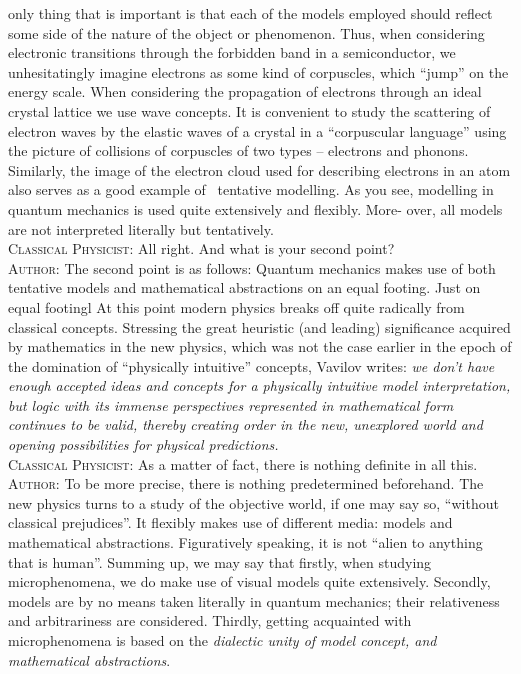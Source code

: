 \documentclass[a4paper,sfsidenotes,colorlinks=true]{tufte-book}
\numberwithin{equation}{section}
\numberwithin{figure}{section}
\begin{document}
only thing that is important is that each of the models employed
should reflect some side of the nature of the object or
phenomenon. Thus, when considering electronic transitions through the
forbidden band in a semiconductor, we unhesitatingly imagine electrons
as some kind of corpuscles, which ``jump'' on the energy scale. When
considering the propagation of electrons through an ideal crystal
lattice we use wave concepts. It is convenient to study the scattering
of electron waves by the elastic waves of a crystal in a ``corpuscular
language'' using the picture of collisions of corpuscles of two types
-- electrons and phonons.  Similarly, the image of the electron cloud
used for describing electrons in an atom also serves as a good example
of ~tentative modelling. As you see, modelling in quantum mechanics is
used quite extensively and flexibly. More- over, all models are not
interpreted literally but tentatively.
\\
\textsc{Classical Physicist:} All right. And what is your second
point?
\\
\textsc{Author:} The second point is as follows: Quantum mechanics
makes use of both tentative models and mathematical abstractions on an
equal footing. Just on equal footingl At this point modern physics
breaks off quite radically from classical concepts. Stressing the
great heuristic (and leading) significance acquired by mathematics in
the new physics, which was not the case earlier in the epoch of the
domination of ``physically intuitive'' concepts, Vavilov writes:
\emph{we don't have enough accepted ideas and concepts for a
  physically intuitive model interpretation, but logic with its
  immense perspectives represented in mathematical form continues to
  be valid, thereby creating order in the new, unexplored world and
  opening possibilities for physical predictions.}\cite{vavilov-1970}
\\
\textsc{Classical Physicist:} As a matter of fact, there is nothing
definite in all this.
\\
\textsc{Author:} To be more precise, there is nothing predetermined
beforehand. The new physics turns to a study of the objective world,
if one may say so, ``without classical prejudices''. It flexibly makes
use of different media: models and mathematical
abstractions. Figuratively speaking, it is not ``alien to anything
that is human''. Summing up, we may say that firstly, when studying
microphenomena, we do make use of visual models quite
extensively. Secondly, models are by no means taken literally in
quantum mechanics; their relativeness and arbitrariness are
considered. Thirdly, getting acquainted with microphenomena is based
on the \emph{dialectic unity of model concept, and mathematical
  abstractions}.
\end{document}
